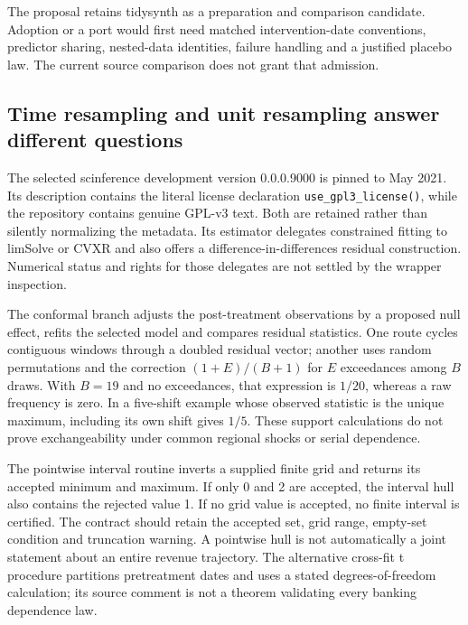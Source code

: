 The proposal retains tidysynth as a preparation and comparison candidate.
Adoption or a port would first need matched intervention-date conventions,
predictor sharing, nested-data identities, failure handling and a justified
placebo law. The current source comparison does not grant that admission.
\citep{exec25_synthr_choice}

\subsection{Time resampling and unit resampling answer different questions}
The selected scinference development version 0.0.0.9000 is pinned to May
2021. Its description contains the literal license declaration
\texttt{use\_gpl3\_license()}, while the repository contains genuine GPL-v3
text. Both are retained rather than silently normalizing the metadata.
Its estimator delegates constrained fitting to limSolve or CVXR and also
offers a difference-in-differences residual construction. Numerical status
and rights for those delegates are not settled by the wrapper inspection.
\citep{exec25_synthr_scinference}

The conformal branch adjusts the post-treatment observations by a proposed
null effect, refits the selected model and compares residual statistics.
One route cycles contiguous windows through a doubled residual vector; another
uses random permutations and the correction $(1+E)/(B+1)$ for $E$
exceedances among $B$ draws. With $B=19$ and no exceedances, that expression
is $1/20$, whereas a raw frequency is zero. In a five-shift example whose
observed statistic is the unique maximum, including its own shift gives
$1/5$. These support calculations do not prove exchangeability under common
regional shocks or serial dependence.~\citep{exec25_synthr_scinference,
exec25_synthr_choice}

The pointwise interval routine inverts a supplied finite grid and returns
its accepted minimum and maximum. If only 0 and 2 are accepted, the interval
hull also contains the rejected value 1. If no grid value is accepted, no
finite interval is certified. The contract should retain the accepted set,
grid range, empty-set condition and truncation warning. A pointwise hull is
not automatically a joint statement about an entire revenue trajectory.
The alternative cross-fit t procedure partitions pretreatment dates and
uses a stated degrees-of-freedom calculation; its source comment is not a
theorem validating every banking dependence law.~\citep{exec25_synthr_scinference,
exec25_synthr_choice}

